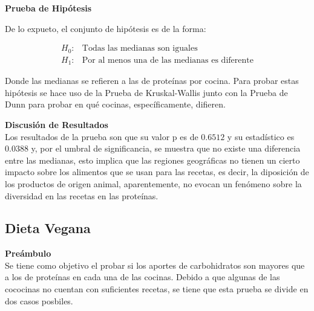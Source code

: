 \documentclass[12pt,a4paper]{article}
\begin{document}
        \textbf{Prueba de Hipótesis}\\
        {
            De lo expueto, el conjunto de hipótesis es de la forma:

            \begin{align*}
                H_0 :& \text{Todas las medianas son iguales} \\
                H_1 :& \text{Por al menos una de las medianas es diferente}
            \end{align*}

            Donde las medianas se refieren a las de proteínas por cocina. Para probar 
            estas hipótesis se hace uso de la Prueba de Kruskal-Wallis junto con la 
            Prueba de Dunn para probar en qué cocinas, específicamente, difieren.\\
        }

        \textbf{Discusión de Resultados}\\
        {
            Los resultados de la prueba son que su valor p es de $0.6512$ y su estadístico es 
            $0.0388$ y, por el umbral de significancia, se muestra que no existe una diferencia entre 
            las medianas, esto implica que las regiones geográficas no tienen un cierto impacto sobre 
            los alimentos que se usan para las recetas, es decir, la diposición de los productos de 
            origen animal, aparentemente, no evocan un fenómeno sobre la diversidad en las recetas 
            en las proteínas.
        }

    \subsection{Dieta Vegana}
        \textbf{Preámbulo}\\
        {
            Se tiene como objetivo el probar si los aportes de carbohidratos son mayores 
            que a los de proteínas en cada una de las cocinas. Debido a que algunas de las 
            cococinas no cuentan con suficientes recetas, se tiene que esta prueba se divide 
            en dos casos posbiles.\\
        }
\end{document}
